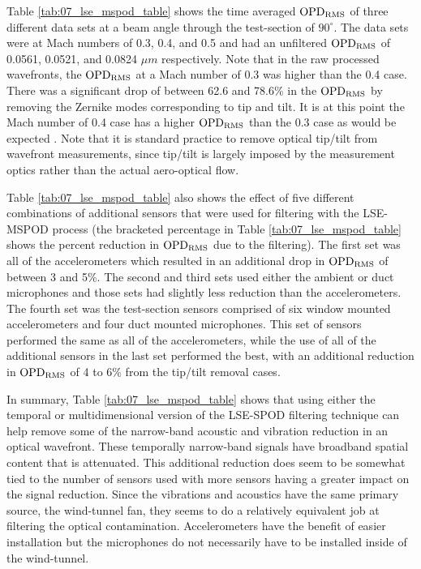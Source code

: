 Table \ref{tab:07_lse_mspod_table} shows the time averaged $\operatorname{OPD_{RMS}}$ of three different data sets at a beam angle through the test-section of $90^\circ$.
The data sets were at Mach numbers of 0.3, 0.4, and 0.5 and had an unfiltered $\operatorname{OPD_{RMS}}$ of 0.0561, 0.0521, and 0.0824 $\mu m$ respectively.
Note that in the raw processed wavefronts, the $\operatorname{OPD_{RMS}}$ at a Mach number of 0.3 was higher than the 0.4 case.
There was a significant drop of between 62.6 and 78.6\% in the $\operatorname{OPD_{RMS}}$ by removing the Zernike modes corresponding to tip and tilt.
It is at this point the Mach number of 0.4 case has a higher $\operatorname{OPD_{RMS}}$ than the 0.3 case as would be expected \cite{Gordeyev-2014-jcJndkHM}.
Note that it is standard practice to remove optical tip/tilt from wavefront measurements, since tip/tilt is largely imposed by the measurement optics rather than the actual aero-optical flow.

Table \ref{tab:07_lse_mspod_table} also shows the effect of five different combinations of additional sensors that were used for filtering with the LSE-MSPOD process (the bracketed percentage in Table \ref{tab:07_lse_mspod_table} shows the percent reduction in $\operatorname{OPD_{RMS}}$ due to the filtering).
The first set was all of the accelerometers which resulted in an additional drop in $\operatorname{OPD_{RMS}}$ of between 3 and 5\%.
The second and third sets used either the ambient or duct microphones and those sets had slightly less reduction than the accelerometers.
The fourth set was the test-section sensors comprised of six window mounted accelerometers and four duct mounted microphones.
This set of sensors performed the same as all of the accelerometers, while the use of all of the additional sensors in the last set performed the best, with an additional reduction in $\operatorname{OPD_{RMS}}$ of 4 to 6\% from the tip/tilt removal cases.


In summary, Table \ref{tab:07_lse_mspod_table} shows that using either the temporal or multidimensional version of the LSE-SPOD filtering technique can help remove some of the narrow-band acoustic and vibration reduction in an optical wavefront.
These temporally narrow-band signals have broadband spatial content that is attenuated.
This additional reduction does seem to be somewhat tied to the number of sensors used with more sensors having a greater impact on the signal reduction.
Since the vibrations and acoustics have the same primary source, the wind-tunnel fan, they seems to do a relatively equivalent job at filtering the optical contamination.
Accelerometers have the benefit of easier installation but the microphones do not necessarily have to be installed inside of the wind-tunnel.

